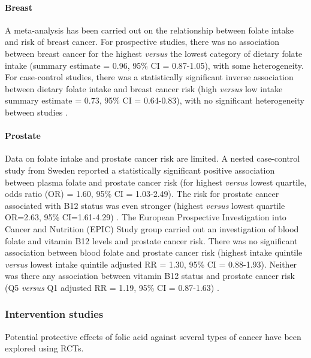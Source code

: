 \vspace{-0.4cm}
\paragraph{Breast} %
A meta-analysis has been carried out on the relationship between folate intake and risk of breast cancer. For prospective studies, there was no association between breast cancer for the highest \emph{versus} the lowest category of dietary folate intake (summary estimate = 0.96, 95\% CI = 0.87-1.05), with some heterogeneity. For case-control studies, there was a statistically significant inverse association between dietary folate intake and breast cancer risk (high \emph{versus} low intake summary estimate = 0.73, 95\% CI = 0.64-0.83), with no significant heterogeneity between studies \cite{c235}. 

\vspace{-0.4cm}
\paragraph{Prostate} %
Data on folate intake and prostate cancer risk are limited. A nested case-control study from Sweden reported a statistically significant positive association between plasma folate and prostate cancer risk (for highest \emph{versus} lowest quartile, odds ratio (OR) = 1.60, 95\% CI = 1.03-2.49). The risk for prostate cancer associated with B12 status was even stronger (highest \emph{versus} lowest quartile OR=2.63, 95\% CI=1.61-4.29) \cite{c236}. The European Prospective Investigation into Cancer and Nutrition (EPIC) Study group carried out an investigation of blood folate and vitamin B12 levels and prostate cancer risk. There was no significant association between blood folate and prostate cancer risk (highest intake quintile \emph{versus} lowest intake quintile adjusted RR = 1.30, 95\% CI = 0.88-1.93). Neither was there any association between vitamin B12 status and prostate cancer risk (Q5 \emph{versus} Q1 adjusted RR = 1.19, 95\% CI = 0.87-1.63) \cite{c237}. 
 
\subsubsection{Intervention studies} %
\noindent Potential protective effects of folic acid against several types of cancer have been explored using RCTs. 

\vspace{-0.4cm}
